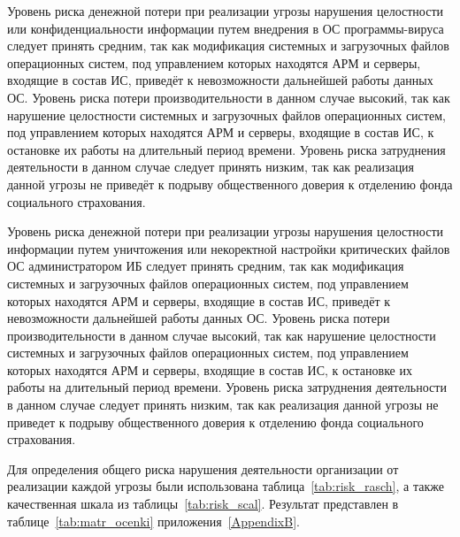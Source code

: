 \point Уровень риска денежной потери при реализации угрозы нарушения
целостности или конфиденциальности информации путем внедрения в ОС
программы-вируса следует принять средним, так как модификация
системных и загрузочных файлов операционных систем, под управлением
которых находятся АРМ и серверы, входящие в состав ИС, приведёт к
невозможности дальнейшей работы данных ОС. Уровень риска потери
производительности в данном случае высокий, так как нарушение
целостности системных и загрузочных файлов операционных систем, под
управлением которых находятся АРМ и серверы, входящие в состав ИС, к
остановке их работы на длительный период времени. Уровень риска
затруднения деятельности в данном случае следует принять низким, так
как реализация данной угрозы не приведёт к подрыву общественного
доверия к отделению фонда социального страхования.

\point Уровень риска денежной потери при реализации угрозы нарушения
целостности информации путем уничтожения или некоректной настройки
критических файлов ОС администратором ИБ следует принять средним, так
как модификация системных и загрузочных файлов операционных систем,
под управлением которых находятся АРМ и серверы, входящие в состав ИС,
приведёт к невозможности дальнейшей работы данных ОС. Уровень риска
потери производительности в данном случае высокий, так как нарушение
целостности системных и загрузочных файлов операционных систем, под
управлением которых находятся АРМ и серверы, входящие в состав ИС, к
остановке их работы на длительный период времени. Уровень риска
затруднения деятельности в данном случае следует принять низким, так
как реализация данной угрозы не приведет к подрыву общественного
доверия к отделению фонда социального страхования.

\point Для определения общего риска нарушения деятельности организации
от реализации каждой угрозы были использована
таблица~\ref{tab:risk_rasch}, а также качественная шкала из
таблицы~\ref{tab:risk_scal}. Результат представлен в
таблице~\ref{tab:matr_ocenki} приложения~\ref{AppendixB}.

